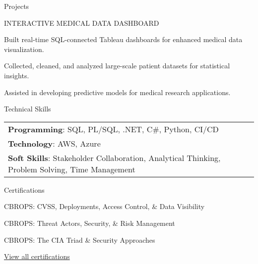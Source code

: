 \documentclass{resume} %
\begin{document}
\begin{rSection}{Projects}
\begin{rSubsection}
                            \end{rSubsection}
                    \begin{rSubsection}
                                    {INTERACTIVE MEDICAL DATA DASHBOARD}
                                {}{}{}
                                    \item Built real{-}time SQL{-}connected Tableau dashboards for enhanced medical data visualization.
                                    \item Collected, cleaned, and analyzed large{-}scale patient datasets for statistical insights.
                                    \item Assisted in developing predictive models for medical research applications.
                            \end{rSubsection}
            \end{rSection}

    \begin{rSection}{Technical Skills}
        \begin{tabular}{ @{} l @{	} l }
                                \textbf{Programming}: SQL, PL/SQL, .NET, C\#, Python, CI/CD\\
                                \textbf{Technology}: AWS, Azure\\
                                \textbf{Soft Skills}: Stakeholder Collaboration, Analytical Thinking, Problem Solving, Time Management\\
        \end{tabular}
    \end{rSection}

    \begin{rSection}{Certifications}
        \begin{rSubsection}{}{}{}
                            \item CBROPS: CVSS, Deployments, Access Control, \& Data Visibility
                            \item CBROPS: Threat Actors, Security, \& Risk Management
                            \item CBROPS: The CIA Triad \& Security Approaches
                    \end{rSubsection}
        \href{https://skillsoft.digitalbadges.skillsoft.com/profile/umairsaeed185770/wallet}{View all certifications}
    \end{rSection}
\end{document}
